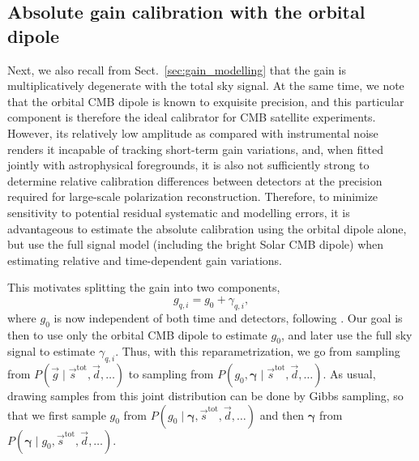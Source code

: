 \documentclass[twocolumn]{aa}
\renewcommand{\d}[0]{\vec{d}}
\newcommand{\s}[0]{\vec{s}}
\newcommand{\g}[0]{\vec{g}}
\newcommand{\bgamma}[0]{\boldsymbol{\gamma}}
\newcommand{\qi}[0]{_{q, i}}
\newcommand{\tot}[0]{^{\mathrm{tot}}}
\begin{document}
\subsection{Absolute gain calibration with the orbital dipole}
Next, we also recall from Sect.~\ref{sec:gain_modelling} that the gain
is multiplicatively degenerate with the total sky signal. At the same
time, we note that the orbital CMB dipole is known to exquisite
precision, and this particular component is therefore the ideal
calibrator for CMB satellite experiments. However, its relatively low
amplitude as compared with instrumental noise renders it incapable of
tracking short-term gain variations, and, when fitted jointly with
astrophysical foregrounds, it is also not sufficiently strong to
determine relative calibration differences between detectors at the
precision required for large-scale polarization
reconstruction. Therefore, to minimize sensitivity to potential
residual systematic and modelling errors, it is advantageous to
estimate the absolute calibration using the orbital dipole alone, but
use the full signal model (including the bright Solar CMB dipole) when
estimating relative and time-dependent gain variations.

This motivates splitting the gain into two components, 
\begin{equation}
  g\qi = g_0 + \gamma\qi,
  \label{eq:split1}
\end{equation}
where $g_0$ is now independent of both time and detectors, following
\citet{planck2020-LVII}. Our goal is then to use only the orbital CMB
dipole to estimate $g_0$, and later use the full sky signal to
estimate $\gamma\qi$. Thus, with this reparametrization, we go from
sampling from $P(\g\mid\s\tot, \d, \ldots)$ to sampling from $P(g_0,
\bgamma\mid\s\tot, \d, \ldots)$. As usual, drawing samples from this
joint distribution can be done by Gibbs sampling, so that we first
sample $g_0$ from $P(g_0 \mid \bgamma, \s\tot, \d, \ldots)$ and then
$\bgamma$ from $P(\bgamma\mid g_0, \s\tot, \d, \ldots)$.
\end{document}
